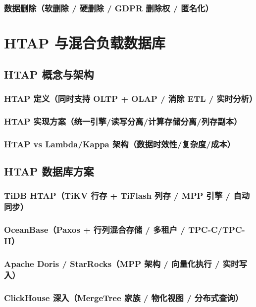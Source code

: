 \documentclass[12pt,UTF8]{ctexbook}
\begin{document}
    \subsection{数据删除（软删除 / 硬删除 / GDPR 删除权 / 匿名化）}


\chapter{HTAP 与混合负载数据库}
\label{chap:htap}

  \section{HTAP 概念与架构}
    \subsection{HTAP 定义（同时支持 OLTP + OLAP / 消除 ETL / 实时分析）}
    \subsection{HTAP 实现方案（统一引擎/读写分离/计算存储分离/列存副本）}
    \subsection{HTAP vs Lambda/Kappa 架构（数据时效性/复杂度/成本）}

  \section{HTAP 数据库方案}
    \subsection{TiDB HTAP（TiKV 行存 + TiFlash 列存 / MPP 引擎 / 自动同步）}
    \subsection{OceanBase（Paxos + 行列混合存储 / 多租户 / TPC-C/TPC-H）}
    \subsection{Apache Doris / StarRocks（MPP 架构 / 向量化执行 / 实时写入）}
    \subsection{ClickHouse 深入（MergeTree 家族 / 物化视图 / 分布式查询）}
\end{document}
